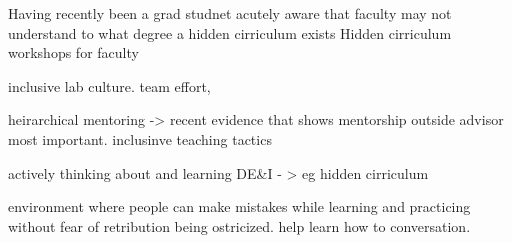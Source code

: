 \documentclass[11pt]{article}
\begin{document}





Having recently been a grad studnet acutely aware that faculty may not understand to what degree a hidden cirriculum exists
Hidden cirriculum workshops for faculty


inclusive lab culture. 
team effort, 

heirarchical mentoring -> recent evidence that shows mentorship outside advisor most important. 
inclusinve teaching tactics


actively thinking about and learning DE\&I - > eg hidden cirriculum 

environment where people can make mistakes while learning and practicing without fear of retribution being ostricized. help learn how to conversation.
 
\end{document}
